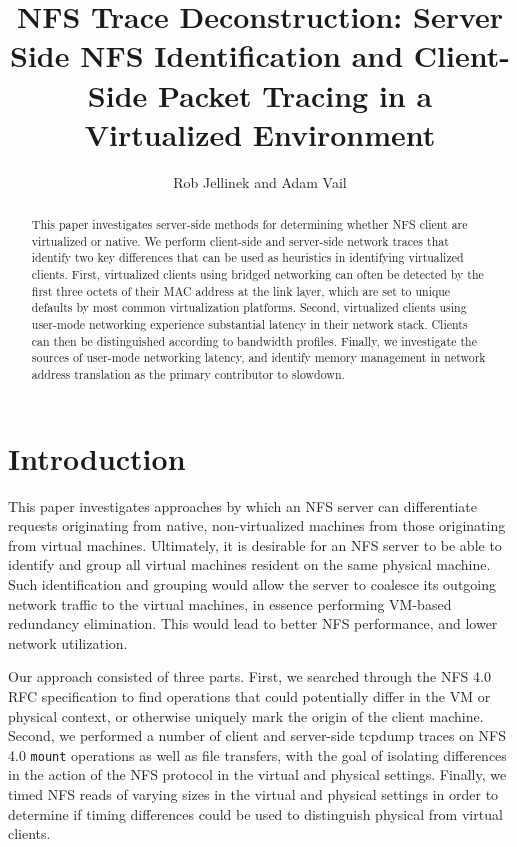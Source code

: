 \documentclass[11pt,pdftex,twocolumn]{article}
\title{NFS Trace Deconstruction: 
Server Side NFS Identification and Client-Side Packet Tracing in a Virtualized Environment}
\author{Rob Jellinek and Adam Vail}
\begin{document}
\maketitle

\begin{abstract}
This paper investigates server-side methods for determining whether NFS client are virtualized or native. We perform client-side and server-side network traces that identify two key differences that can be used as heuristics in identifying virtualized clients. First, virtualized clients using bridged networking can often be detected by the first three octets of their MAC address at the link layer, which are set to unique defaults by most common virtualization platforms. Second, virtualized clients using user-mode networking experience substantial latency in their network stack. Clients can then be distinguished according to bandwidth profiles. Finally, we investigate the sources of user-mode networking latency, and identify memory management in network address translation as the primary contributor to slowdown.
\end{abstract}

\section{Introduction}
This paper investigates approaches by which an NFS server can differentiate requests originating from native, non-virtualized machines from those originating from virtual machines. 
Ultimately, it is desirable for an NFS server to be able to identify and group all virtual machines resident on the same physical machine. Such identification and grouping would allow the server to coalesce its outgoing network traffic to the virtual machines, in essence performing VM-based redundancy elimination. This would lead to better NFS performance, and lower network utilization.

Our approach consisted of three parts. First, we searched through the NFS 4.0 RFC specification \cite{shepler2003network} to find operations that could potentially differ in the VM or physical context, or otherwise uniquely mark the origin of the client machine. Second, we performed a number of client and server-side tcpdump traces on NFS 4.0 \texttt{mount} operations as well as file transfers, with the goal of isolating differences in the action of the NFS protocol in the virtual and physical settings. Finally, we timed NFS reads of varying sizes in the virtual and physical settings in order to determine if timing differences could be used to distinguish physical from virtual clients. 
\end{document}
